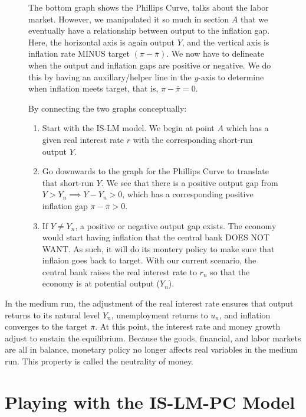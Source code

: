 \documentclass{extarticle}
\begin{document}
\begin{figure}[H]
\begin{minipage}{0.6\linewidth}
    \vspace{2mm}

    The bottom graph shows the Phillips Curve, talks about the labor market. However, we manipulated it so much in section $A$ that we eventually have a relationship between output to the inflation gap. 
    Here, the horizontal axis is again output $Y$, and the vertical axis is inflation rate MINUS target $(\pi - \overline{\pi})$. We now have to delineate when the output and inflation gaps are positive or negative. We do this by having an auxillary/helper line in the $y$-axis to determine when inflation meets target, that is, $\pi - \overline{\pi} = 0$.
    
    \vspace{2mm}
    By connecting the two graphs conceptually:
    \begin{enumerate}
        \item Start with the IS-LM model. We begin at point $A$ which has a given real interest rate $r$ with the corresponding short-run output $Y$.
        \item Go downwards to the graph for the Phillips Curve to translate that short-run $Y$. We see that there is a positive output gap from $Y > Y_n \implies Y - Y_n > 0$, which has a corresponding positive inflation gap $\pi - \overline{\pi} > 0$.
        \item If $Y \neq Y_n$, a positive or negative output gap exists. The economy would start having inflation that the central bank DOES NOT WANT. As such, it will do its montery policy to make sure that inflaion goes back to target. With our current scenario, the central bank raises the real interest rate to $r_n$ so that the economy is at potential output ($Y_n$).
    \end{enumerate}
  \end{minipage} 
\end{figure}

In the medium run, the adjustment of the real interest rate ensures that output returns to its natural level $Y_n$, unemployment returns to $u_n$, and inflation converges to the target $\overline{\pi}$. 
At this point, the interest rate and money growth adjust to sustain the equilibrium. Because the goods, financial, and labor markets are all in balance, monetary policy no longer affects real variables in the medium run. This property is called the neutrality of money.


\section{Playing with the IS-LM-PC Model}
\end{document}
